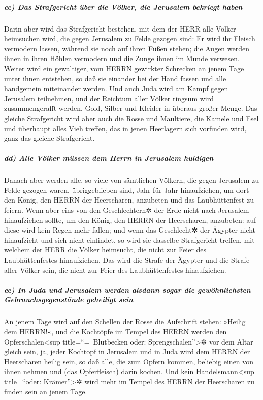 \hypertarget{cc-das-strafgericht-uxfcber-die-vuxf6lker-die-jerusalem-bekriegt-haben}{%
\subparagraph{cc) Das Strafgericht über die Völker, die Jerusalem
bekriegt
haben}\label{cc-das-strafgericht-uxfcber-die-vuxf6lker-die-jerusalem-bekriegt-haben}}

 Darin aber wird das Strafgericht bestehen, mit dem der
HERR alle Völker heimsuchen wird, die gegen Jerusalem zu Felde gezogen
sind: Er wird ihr Fleisch vermodern lassen, während sie noch auf ihren
Füßen stehen; die Augen werden ihnen in ihren Höhlen vermodern und die
Zunge ihnen im Munde verwesen.  Weiter wird ein
gewaltiger, vom HERRN gewirkter Schrecken an jenem Tage unter ihnen
entstehen, so daß sie einander bei der Hand fassen und alle handgemein
miteinander werden.  Und auch Juda wird am Kampf gegen
Jerusalem teilnehmen, und der Reichtum aller Völker ringsum wird
zusammengerafft werden, Gold, Silber und Kleider in überaus großer
Menge.  Das gleiche Strafgericht wird aber auch die Rosse
und Maultiere, die Kamele und Esel und überhaupt alles Vieh treffen, das
in jenen Heerlagern sich vorfinden wird, ganz das gleiche Strafgericht.

\hypertarget{dd-alle-vuxf6lker-muxfcssen-dem-herrn-in-jerusalem-huldigen}{%
\subparagraph{dd) Alle Völker müssen dem Herrn in Jerusalem
huldigen}\label{dd-alle-vuxf6lker-muxfcssen-dem-herrn-in-jerusalem-huldigen}}

 Danach aber werden alle, so viele von sämtlichen
Völkern, die gegen Jerusalem zu Felde gezogen waren, übriggeblieben
sind, Jahr für Jahr hinaufziehen, um dort den König, den HERRN der
Heerscharen, anzubeten und das Laubhüttenfest zu feiern. 
Wenn aber eins von den Geschlechtern✲ der Erde nicht nach Jerusalem
hinaufziehen sollte, um den König, den HERRN der Heerscharen, anzubeten:
auf diese wird kein Regen mehr fallen;  und wenn das
Geschlecht✲ der Ägypter nicht hinaufzieht und sich nicht einfindet, so
wird sie dasselbe Strafgericht treffen, mit welchem der HERR die Völker
heimsucht, die nicht zur Feier des Laubhüttenfestes hinaufziehen.
 Das wird die Strafe der Ägypter und die Strafe aller
Völker sein, die nicht zur Feier des Laubhüttenfestes hinaufziehen.

\hypertarget{ee-in-juda-und-jerusalem-werden-alsdann-sogar-die-gewuxf6hnlichsten-gebrauchsgegenstuxe4nde-geheiligt-sein}{%
\subparagraph{ee) In Juda und Jerusalem werden alsdann sogar die
gewöhnlichsten Gebrauchsgegenstände geheiligt
sein}\label{ee-in-juda-und-jerusalem-werden-alsdann-sogar-die-gewuxf6hnlichsten-gebrauchsgegenstuxe4nde-geheiligt-sein}}

 An jenem Tage wird auf den Schellen der Rosse die
Aufschrift stehen: »Heilig dem HERRN!«, und die Kochtöpfe im Tempel des
HERRN werden den Opferschalen\textless sup title=``=~Blutbecken oder:
Sprengschalen''\textgreater✲ vor dem Altar gleich sein, 
ja, jeder Kochtopf in Jerusalem und in Juda wird dem HERRN der
Heerscharen heilig sein, so daß alle, die zum Opfern kommen, beliebig
einen von ihnen nehmen und (das Opferfleisch) darin kochen. Und kein
Handelsmann\textless sup title=``oder: Krämer''\textgreater✲ wird mehr
im Tempel des HERRN der Heerscharen zu finden sein an jenem Tage.
